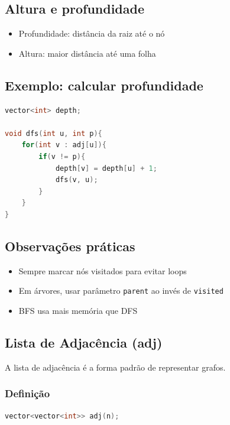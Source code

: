 \documentclass[11pt]{article}
\begin{document}
\subsection{Altura e profundidade}

\begin{itemize}
    \item Profundidade: distância da raiz até o nó
    \item Altura: maior distância até uma folha
\end{itemize}

\subsection{Exemplo: calcular profundidade}

\begin{lstlisting}[language=C++]
vector<int> depth;

void dfs(int u, int p){
    for(int v : adj[u]){
        if(v != p){
            depth[v] = depth[u] + 1;
            dfs(v, u);
        }
    }
}
\end{lstlisting}

\subsection{Observações práticas}

\begin{itemize}
    \item Sempre marcar nós visitados para evitar loops
    \item Em árvores, usar parâmetro \texttt{parent} ao invés de \texttt{visited}
    \item BFS usa mais memória que DFS
\end{itemize}

\subsection{Lista de Adjacência (adj)}

A lista de adjacência é a forma padrão de representar grafos.

\subsubsection{Definição}

\begin{lstlisting}[language=C++]
vector<vector<int>> adj(n);
\end{lstlisting}
\end{document}
